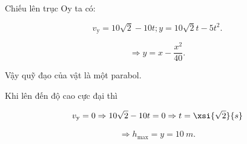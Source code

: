 \begin{enumerate}[label=\bfseries Câu \arabic*:]
{		Chiếu lên trục Oy ta có:
		
		$$v_\text{y} = 10\sqrt 2 - 10t; y = 10\sqrt 2 t - 5t^2.$$
		
		$$\Rightarrow y = x - \dfrac{x^2}{40}.$$
		
		Vậy quỹ đạo của vật là một parabol.
		
		Khi lên đến độ cao cực đại thì
		
		$$v_\text{y} = 0 \Rightarrow 10\sqrt 2 - 10t =0 \Rightarrow t = \xsi{\sqrt 2}{s}$$
		
		$$\Rightarrow h_\text{max} = y = \SI{10}{m}.$$
		}

\end{enumerate}